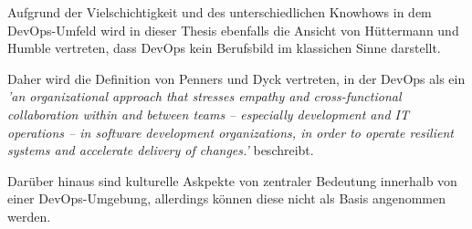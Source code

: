 Aufgrund der Vielschichtigkeit und des unterschiedlichen Knowhows in dem DevOps-Umfeld wird in dieser Thesis ebenfalls die Ansicht von Hüttermann und Humble vertreten, dass DevOps kein Berufsbild im klassichen Sinne darstellt.

Daher wird die Definition von Penners und Dyck \cite{dyck_towards_2015} vertreten, in der DevOps als ein \textit{'an organizational approach that stresses empathy and cross-functional collaboration within and between teams – especially development and IT operations – in software development organizations, in order to operate resilient systems and accelerate delivery of changes.'} beschreibt. 

Darüber hinaus sind kulturelle Askpekte von zentraler Bedeutung innerhalb von einer DevOps-Umgebung, allerdings können diese nicht als Basis angenommen werden. \cite{smeds_devops_2015}



